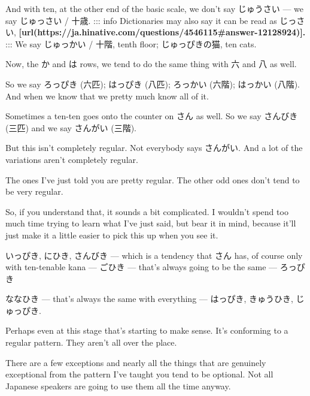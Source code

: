 And with ten, at the other end of the basic scale, we don't say じゅうさい --- we say じゅっさい / 十歳. ::: info Dictionaries may also say it can be read as じっさい, {\bf {}[url(https://ja.hinative.com/questions/4546115\#answer-12128924)].} ::: We say じゅっかい / 十階, tenth floor; じゅっぴきの猫, ten cats.

\stopsectionlevel

\startsectionlevel[title={Rule 3},reference={rule-3}]

{}

Now, the か and は rows, we tend to do the same thing with 六 and 八 as well.

So we say ろっぴき (六匹); はっぴき (八匹); ろっかい (六階); はっかい (八階). And when we know that we pretty much know all of it.

\stopsectionlevel

\startsectionlevel[title={Rule 4?},reference={rule-4}]

{}

Sometimes a ten-ten goes onto the counter on さん as well. So we say さんびき (三匹) and we say さんがい (三階).

But this isn't completely regular. Not everybody says さんがい. And a lot of the variations aren't completely regular.

The ones I've just told you are pretty regular. The other odd ones don't tend to be very regular.

So, if you understand that, it sounds a bit complicated. I wouldn't spend too much time trying to learn what I've just said, but bear it in mind, because it'll just make it a little easier to pick this up when you see it.

いっぴき, にひき, さんびき --- which is a tendency that さん has, of course only with ten-tenable kana --- ごひき --- that's always going to be the same --- ろっぴき

ななひき --- that's always the same with everything --- はっぴき, きゅうひき, じゅっぴき.

Perhaps even at this stage that's starting to make sense. It's conforming to a regular pattern. They aren't all over the place.

There are a few exceptions and nearly all the things that are genuinely exceptional from the pattern I've taught you tend to be optional. Not all Japanese speakers are going to use them all the time anyway.

